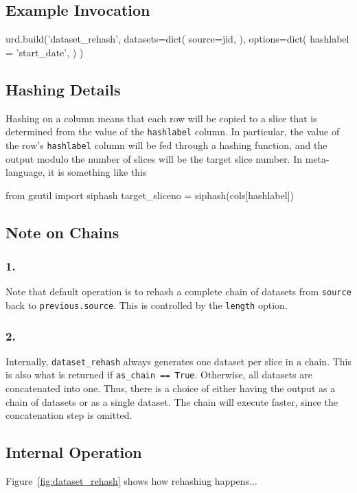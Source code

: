 \subsection{Example Invocation}
\begin{python}
urd.build('dataset_rehash',
  datasets=dict(
    source=jid,
  ), 
  options=dict(
    hashlabel = 'start_date',
  )
)
\end{python}



\subsection{Hashing Details}
Hashing on a column means that each row will be copied to a slice that
is determined from the value of the \texttt{hashlabel} column.  In
particular, the value of the row's \texttt{hashlabel} column will be
fed through a hashing function, and the output modulo the number of
slices will be the target slice number.  In meta-language, it is
something like this
\\
\begin{python}
from gzutil import siphash
target_sliceno = siphash(cols[hashlabel])
\end{python}


\subsection{Note on Chains}
\subsubsection{1.}
Note that default operation is to rehash a complete chain of datasets
from \texttt{source} back to \texttt{previous.source}.  This is
controlled by the \texttt{length} option.

\subsubsection{2.}
Internally, \texttt{dataset\_rehash} always generates one dataset per
slice in a chain.  This is also what is returned if \texttt{as\_chain
  == True}.  Otherwise, all datasets are concatenated into one.  Thus,
there is a choice of either having the output as a chain of datasets
or as a single dataset.  The chain will execute faster, since the
concatenation step is omitted.


\clearpage
\subsection{Internal Operation}
Figure~\ref{fig:dataset_rehash} shows how rehashing happens...

